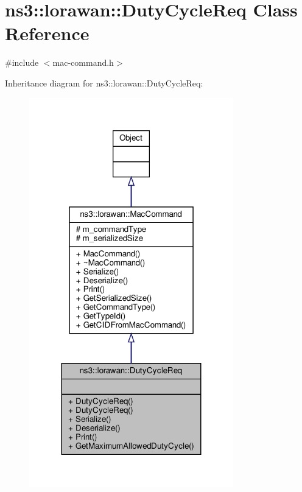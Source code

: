 \hypertarget{classns3_1_1lorawan_1_1DutyCycleReq}{}\section{ns3\+:\+:lorawan\+:\+:Duty\+Cycle\+Req Class Reference}
\label{classns3_1_1lorawan_1_1DutyCycleReq}


{\ttfamily \#include $<$mac-\/command.\+h$>$}



Inheritance diagram for ns3\+:\+:lorawan\+:\+:Duty\+Cycle\+Req\+:
\nopagebreak
\begin{figure}[H]
\begin{center}
\leavevmode
\includegraphics[width=251pt]{classns3_1_1lorawan_1_1DutyCycleReq__inherit__graph}
\end{center}
\end{figure}


